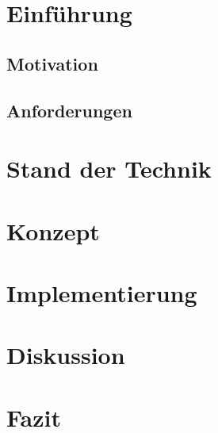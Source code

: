 \documentclass[11pt,a4paper]{scrartcl}
\begin{document}
	

	\tableofcontents
	\newpage
 	
 	\section{Einführung}\label{sec:introduction}
	\subsection{Motivation}\label{subsec:motivation}
	\subsection{Anforderungen}\label{subsec:anforderungen}
	\section{Stand der Technik}\label{sec:state-of-the-art}
	\section{Konzept}\label{sec:konzept}
	\section{Implementierung}\label{sec:implementierung}
	\section{Diskussion}\label{sec:diskussion}
	\section{Fazit}\label{sec:fazit}

	\newpage
 	
 	\listoffigures
\end{document}
